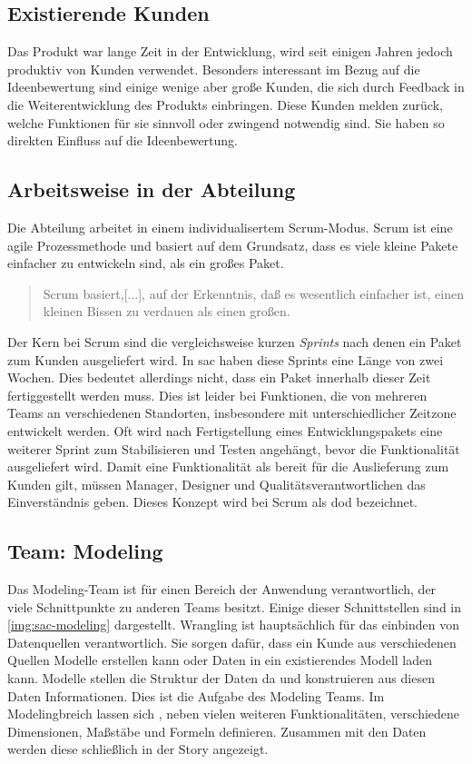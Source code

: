 \subsection{Existierende Kunden}
Das Produkt war lange Zeit in der Entwicklung, wird seit einigen Jahren jedoch produktiv von Kunden verwendet. Besonders 
interessant im Bezug auf die Ideenbewertung sind einige wenige aber große Kunden, die sich durch Feedback in die 
Weiterentwicklung des Produkts einbringen. Diese Kunden melden zurück, welche Funktionen für sie sinnvoll oder 
zwingend notwendig sind. Sie haben so direkten Einfluss auf die Ideenbewertung. 

\subsection{Arbeitsweise in der Abteilung}
Die Abteilung arbeitet in einem individualisertem Scrum-Modus. Scrum ist eine agile Prozessmethode und basiert 
auf dem Grundsatz, dass es viele kleine Pakete einfacher zu entwickeln sind, als ein großes Paket. 
\begin{quote} Scrum basiert,[...], auf der Erkenntnis, daß es wesentlich einfacher ist, einen kleinen Bissen zu verdauen als einen großen.\cite{scrum:2018} \end{quote} 
Der Kern bei Scrum sind die vergleichsweise kurzen \textit{Sprints} nach denen ein Paket zum Kunden ausgeliefert wird. 
In \ac{sac} haben diese Sprints eine Länge von zwei Wochen. Dies bedeutet allerdings nicht, dass ein Paket 
innerhalb dieser Zeit fertiggestellt werden muss. Dies ist leider bei Funktionen, die von mehreren Teams an
verschiedenen Standorten, insbesondere mit unterschiedlicher Zeitzone entwickelt werden. Oft wird nach Fertigstellung eines 
Entwicklungspakets eine weiterer Sprint zum Stabilisieren und Testen angehängt, bevor die Funktionalität ausgeliefert wird.
Damit eine Funktionalität als bereit für die Auslieferung zum Kunden gilt, müssen Manager, Designer und Qualitätsverantwortlichen das 
Einverständnis geben. Dieses Konzept wird bei Scrum als \ac{dod} bezeichnet. 

\subsection{Team: Modeling}
Das Modeling-Team ist für einen Bereich der Anwendung verantwortlich, der viele Schnittpunkte zu anderen Teams besitzt.
Einige dieser Schnittstellen sind in \autoref{img:sac-modeling} dargestellt. Wrangling ist hauptsächlich für das 
einbinden von Datenquellen verantwortlich. Sie sorgen dafür, dass ein Kunde aus verschiedenen Quellen Modelle erstellen kann oder Daten in 
ein existierendes Modell laden kann. 
Modelle stellen die Struktur der Daten da und konstruieren aus diesen Daten Informationen. Dies ist die Aufgabe des Modeling Teams.
Im Modelingbreich lassen sich , neben vielen weiteren Funktionalitäten, verschiedene Dimensionen, Maßstäbe und Formeln definieren. 
Zusammen mit den Daten werden diese schließlich in der Story angezeigt. 

